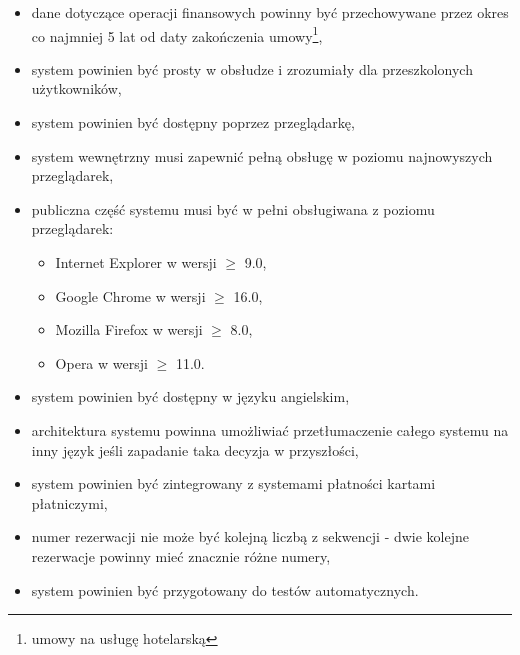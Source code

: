 \documentclass[a4paper,onecolumn,oneside,11pt,wide,floatssmall]{mwrep}
\theoremstyle{definition}
\theoremstyle{plain}%
\theoremstyle{remark}
\begin{document}
\begin{enumerate}
\begin{itemize}
      \item dane dotyczące operacji finansowych powinny być przechowywane przez okres co najmniej 5 lat od daty zakończenia umowy\footnote{umowy na usługę hotelarską},
      \item system powinien być prosty w obsłudze i zrozumiały dla przeszkolonych użytkowników,
      \item system powinien być dostępny poprzez przeglądarkę,
      \item system wewnętrzny musi zapewnić pełną obsługę w poziomu najnowyszych przeglądarek,
      \item publiczna część systemu musi być w pełni obsługiwana z poziomu przeglądarek:
        \begin{itemize}
          \item Internet Explorer w wersji $\geq$ 9.0,
          \item Google Chrome w wersji $\geq$ 16.0,
          \item Mozilla Firefox w wersji $\geq$ 8.0,
          \item Opera w wersji $\geq$ 11.0.
        \end{itemize}
      \item system powinien być dostępny w języku angielskim,
      \item architektura systemu powinna umożliwiać przetłumaczenie całego systemu na inny język jeśli zapadanie taka decyzja w przyszłości,
      \item system powinien być zintegrowany z systemami płatności kartami płatniczymi,
      \item numer rezerwacji nie może być kolejną liczbą z sekwencji - dwie kolejne rezerwacje powinny mieć znacznie różne numery,
      \item system powinien być przygotowany do testów automatycznych.
    \end{itemize}
\end{enumerate}


\appendix


\nocite{*}


% 

\end{document}
